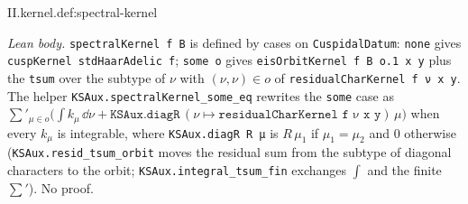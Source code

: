 \begin{tfformal}{II.kernel.def:spectral-kernel}
\begin{tffidelity}
\end{tffidelity}
\end{tfformal}
\noindent\emph{Lean body.} \texttt{spectralKernel f B} is defined by cases on \texttt{CuspidalDatum}: \texttt{none} gives \texttt{cuspKernel stdHaarAdelic f}; \texttt{some o} gives \texttt{eisOrbitKernel f B o.1 x y} plus the \texttt{tsum} over the subtype of $\nu$ with $(\nu,\nu)\in o$ of \texttt{residualCharKernel f ν x y}. The helper \texttt{KSAux.spectralKernel\_some\_eq} rewrites the \texttt{some} case as $\sum'_{\mu\in o}\bigl(\int k_\mu\,\dd\nu+\texttt{KSAux.diagR}\,(\nu\mapsto\texttt{residualCharKernel f ν x y})\,\mu\bigr)$ when every $k_\mu$ is integrable, where \texttt{KSAux.diagR R μ} is $R\,\mu_1$ if $\mu_1=\mu_2$ and $0$ otherwise (\texttt{KSAux.resid\_tsum\_orbit} moves the residual sum from the subtype of diagonal characters to the orbit; \texttt{KSAux.integral\_tsum\_fin} exchanges $\int$ and the finite $\sum'$). No proof.

